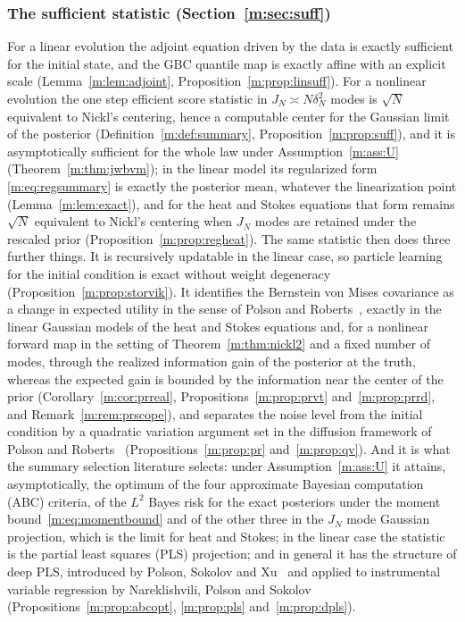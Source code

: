 \subsubsection{The sufficient statistic (Section~\ref{m:sec:suff})} For a linear evolution the adjoint equation driven by the data is exactly sufficient for the initial state, and the GBC quantile map is exactly affine with an explicit scale (Lemma~\ref{m:lem:adjoint}, Proposition~\ref{m:prop:linsuff}). For a nonlinear evolution the one step efficient score statistic in $J_N\asymp N\delta_N^2$ modes is $\sqrt N$ equivalent to Nickl's centering, hence a computable center for the Gaussian limit of the posterior (Definition~\ref{m:def:summary}, Proposition~\ref{m:prop:suff}), and it is asymptotically sufficient for the whole law under Assumption~\ref{m:ass:U} (Theorem~\ref{m:thm:jwbvm}); in the linear model its regularized form \eqref{m:eq:regsummary} is exactly the posterior mean, whatever the linearization point (Lemma~\ref{m:lem:exact}), and for the heat and Stokes equations that form remains $\sqrt N$ equivalent to Nickl's centering when $J_N$ modes are retained under the rescaled prior (Proposition~\ref{m:prop:regheat}). The same statistic then does three further things. It is recursively updatable in the linear case, so particle learning for the initial condition is exact without weight degeneracy (Proposition~\ref{m:prop:storvik}). It identifies the Bernstein von Mises covariance as a change in expected utility in the sense of Polson and Roberts~\cite{polsonroberts1993}, exactly in the linear Gaussian models of the heat and Stokes equations and, for a nonlinear forward map in the setting of Theorem~\ref{m:thm:nickl2} and a fixed number of modes, through the realized information gain of the posterior at the truth, whereas the expected gain is bounded by the information near the center of the prior (Corollary~\ref{m:cor:prreal}, Propositions~\ref{m:prop:prvt} and~\ref{m:prop:prrd}, and Remark~\ref{m:rem:prscope}), and separates the noise level from the initial condition by a quadratic variation argument set in the diffusion framework of Polson and Roberts~\cite{polsonroberts1994} (Propositions~\ref{m:prop:pr} and~\ref{m:prop:qv}). And it is what the summary selection literature selects: under Assumption~\ref{m:ass:U} it attains, asymptotically, the optimum of the four approximate Bayesian computation (ABC) criteria, of the $L^2$ Bayes risk for the exact posteriors under the moment bound~\eqref{m:eq:momentbound} and of the other three in the $J_N$ mode Gaussian projection, which is the limit for heat and Stokes; in the linear case the statistic is the partial least squares (PLS) projection; and in general it has the structure of deep PLS, introduced by Polson, Sokolov and Xu~\cite{polsonsokolovxu2021} and applied to instrumental variable regression by Nareklishvili, Polson and Sokolov~\cite{nareklishvili2023} (Propositions~\ref{m:prop:abcopt}, \ref{m:prop:pls} and~\ref{m:prop:dpls}).

